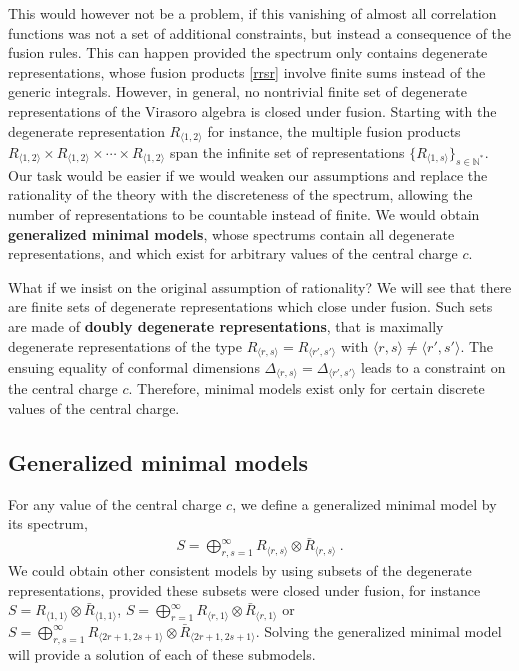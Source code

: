 \documentclass[12pt, a4paper, notitlepage, twoside]{report}
\numberwithin{equation}{section}
\theoremstyle{break}
\begin{document}
This would however not be a problem, if this vanishing of almost all correlation functions was not a set of additional constraints, but instead a consequence of the fusion rules.
This can happen provided the spectrum only contains degenerate representations, whose fusion products \eqref{rrsr} involve finite sums instead of the generic integrals. 
However, in general, no nontrivial finite set of degenerate representations of the Virasoro algebra is closed under fusion.
Starting with the degenerate representation $R_{\langle 1,2 \rangle}$ for instance, the multiple fusion products $R_{\langle 1,2 \rangle}\times R_{\langle 1,2 \rangle}\times \cdots \times R_{\langle 1,2 \rangle}$ span the infinite set of representations $\{R_{\langle 1,s \rangle}\}_{s\in{\mathbb{N}}^*}$.
Our task would be easier if we would weaken our assumptions and replace the rationality of the theory with the discreteness of the spectrum, allowing the number of representations to be countable instead of finite.
We would obtain \textbf{\boldmath generalized minimal models}, whose spectrums contain all degenerate representations, and which exist for arbitrary values of the central charge $c$. 

What if we insist on the original assumption of rationality? We will see that there are finite sets 
of degenerate representations which close under fusion.
Such sets are made of
\textbf{\boldmath doubly degenerate representations}, that is maximally degenerate representations of the type $R_{\langle r,s \rangle}=R_{\langle r',s' \rangle}$ with $\langle r,s \rangle\neq \langle r',s' \rangle$.
The ensuing equality of conformal dimensions $\Delta_{\langle r,s \rangle}=\Delta_{\langle r',s' \rangle}$ leads to a constraint on the central charge $c$.
Therefore, minimal models exist only for certain discrete values of the central charge. 

\subsection{Generalized minimal models}

For any value of the central charge $c$, we define a generalized minimal model by its spectrum,
\begin{align}
 \boxed{S = \bigoplus_{r,s=1}^\infty R_{\langle r,s \rangle}\otimes \bar{R}_{\langle r,s \rangle}}\ .
\end{align}
We could obtain other consistent models by using subsets of the degenerate representations, provided these subsets were closed under fusion, for instance $S=R_{\langle 1,1 \rangle}\otimes \bar{R}_{\langle 1,1 \rangle}$, $S=\bigoplus_{r=1}^\infty R_{\langle r,1 \rangle}\otimes \bar{R}_{\langle r,1 \rangle}$ or $S=\bigoplus_{r,s=1}^{\infty} R_{\langle 2r+1,2s+1 \rangle}\otimes \bar{R}_{\langle 2r+1,2s+1 \rangle}$.
Solving the generalized minimal model will provide a solution of each of these submodels. 
\end{document}
